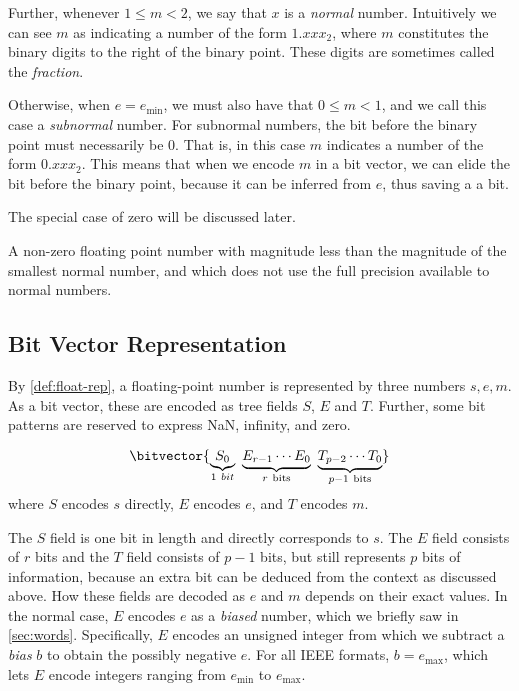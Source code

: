 Further, whenever $1 \leq m < 2$, we say that $x$ is a \emph{normal}
number.  Intuitively we can see $m$ as indicating a number of the form
$1.xxx_{2}$, where $m$ constitutes the binary digits to the right of
the binary point.  These digits are sometimes called the
\emph{fraction}.

Otherwise, when $e=e_{\text{min}}$, we must also have that
$0 \leq m < 1$, and we call this case a \emph{subnormal} number. For
subnormal numbers, the bit before the binary point must necessarily be
0. That is, in this case $m$ indicates a number of the form
$0.xxx_{2}$. This means that when we encode $m$ in a bit vector, we
can elide the bit before the binary point, because it can be inferred
from $e$, thus saving a a bit.

The special case of zero will be discussed later.

\begin{definition}
  A non-zero floating point number with magnitude less than the
  magnitude of the smallest normal number, and which does not use the
  full precision available to normal numbers.
\end{definition}

\subsection{Bit Vector Representation}
\label{sec:float-bits}

By \cref{def:float-rep}, a floating-point number is represented by
three numbers $s,e,m$.  As a bit vector, these are encoded as tree
fields $S$, $E$ and $T$.  Further, some bit patterns are reserved to
express NaN, infinity, and zero.

\begin{definition}
  \[
    \bitvector{\underbrace{S_{0}}_{1~bit}~\underbrace{E_{r-1}\cdots{E_{0}}}_{r~\text{bits}}~\underbrace{T_{p-2}\cdots{}T_{0}}_{p-1~\text{bits}}}
  \]
  where $S$ encodes $s$ directly, $E$ encodes $e$, and $T$ encodes
  $m$.
  \label{def:float-fields}
\end{definition}

The $S$ field is one bit in length and directly corresponds to $s$.
The $E$ field consists of $r$ bits and the $T$ field consists of
$p-1$ bits, but still represents $p$ bits of information, because an
extra bit can be deduced from the context as discussed above. How
these fields are decoded as $e$ and $m$ depends on their exact values.
In the normal case, $E$ encodes $e$ as a \emph{biased} number, which
we briefly saw in \cref{sec:words}.  Specifically, $E$ encodes an
unsigned integer from which we subtract a \emph{bias} $b$ to obtain
the possibly negative $e$.  For all IEEE formats, $b=e_{\text{max}}$,
which lets $E$ encode integers ranging from $e_{\text{min}}$ to
$e_{\text{max}}$.

